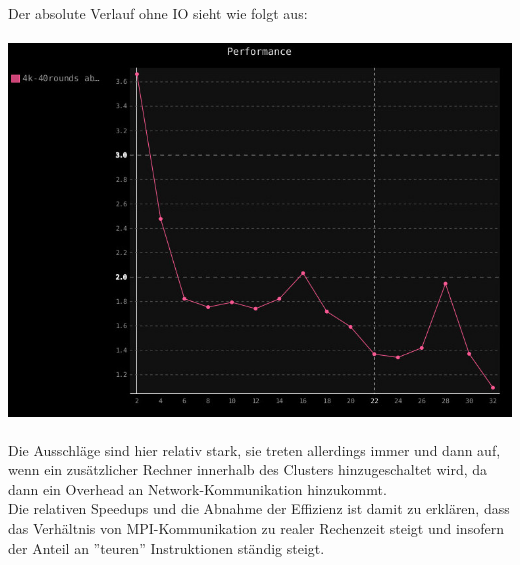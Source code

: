 \newpage
\quad \\
Der absolute Verlauf ohne IO sieht wie folgt aus: \\ \\
\includegraphics[scale=0.52]{pics/perf-abs.jpg}
\quad \\ \\
Die Ausschläge sind hier relativ stark, sie treten allerdings immer und dann auf, wenn ein zusätzlicher Rechner innerhalb des Clusters hinzugeschaltet wird, da dann ein Overhead an Network-Kommunikation
hinzukommt. \\
Die relativen Speedups und die Abnahme der Effizienz ist damit zu erklären, dass das Verhältnis von MPI-Kommunikation zu realer Rechenzeit steigt und insofern der Anteil an ''teuren'' Instruktionen ständig steigt.

